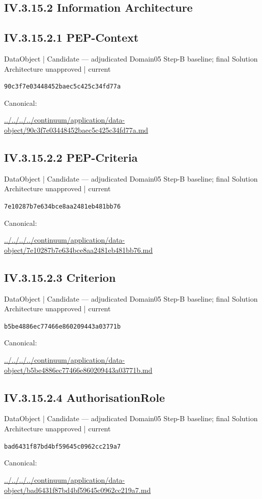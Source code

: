 \documentclass[10pt,a4paper]{article}
\begin{document}
\subsection*{IV.3.15.2 Information Architecture}
\subsection*{IV.3.15.2.1 PEP-Context}
{\small DataObject | Candidate — adjudicated Domain05 Step-B baseline; final Solution Architecture unapproved | current}\par
\texttt{90c3f7e03448452baec5c425c34fd77a}\par
Canonical: \par
{\footnotesize\url{../../../../continuum/application/data-object/90c3f7e03448452baec5c425c34fd77a.md}}\par
\subsection*{IV.3.15.2.2 PEP-Criteria}
{\small DataObject | Candidate — adjudicated Domain05 Step-B baseline; final Solution Architecture unapproved | current}\par
\texttt{7e10287b7e634bce8aa2481eb481bb76}\par
Canonical: \par
{\footnotesize\url{../../../../continuum/application/data-object/7e10287b7e634bce8aa2481eb481bb76.md}}\par
\subsection*{IV.3.15.2.3 Criterion}
{\small DataObject | Candidate — adjudicated Domain05 Step-B baseline; final Solution Architecture unapproved | current}\par
\texttt{b5be4886ec77466e860209443a03771b}\par
Canonical: \par
{\footnotesize\url{../../../../continuum/application/data-object/b5be4886ec77466e860209443a03771b.md}}\par
\subsection*{IV.3.15.2.4 AuthorisationRole}
{\small DataObject | Candidate — adjudicated Domain05 Step-B baseline; final Solution Architecture unapproved | current}\par
\texttt{bad6431f87bd4bf59645c0962cc219a7}\par
Canonical: \par
{\footnotesize\url{../../../../continuum/application/data-object/bad6431f87bd4bf59645c0962cc219a7.md}}\par
\end{document}

